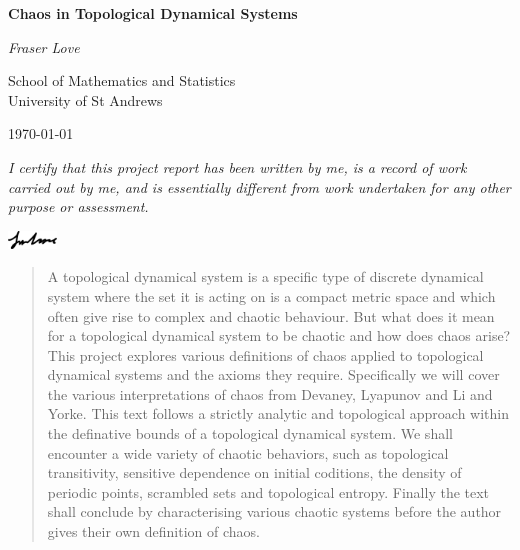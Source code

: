 \documentclass[11pt,a4paper,oneside]{memoir}
\theoremstyle{plain}
\theoremstyle{definition}
\begin{document}
\begin{titlingpage}
    \centering
        \vspace*{3cm}
 
        \Huge
        \textbf{Chaos in Topological Dynamical Systems}
             
        \vspace{1.5cm}
        
        \LARGE
        \textit{Fraser Love}
             
        \vspace{1.5cm}
             
        \Large
        School of Mathematics and Statistics\\
        University of St Andrews\\

        \vfill

        {\large \today\par}
 \end{titlingpage}

\noindent\textit{I certify that this project report has been written by me, is a record of work carried out by me, and is essentially different from work undertaken for any other purpose or assessment.}

\vspace{0cm}\hspace{12.8cm}\includegraphics[width=1.3cm]{signature}

\begin{abstract}
    \noindent A topological dynamical system is a specific type of discrete dynamical system where the set it is acting on is a compact metric space and which often give rise to complex and chaotic behaviour. But what does it mean for a topological dynamical system to be chaotic and how does chaos arise? This project explores various definitions of chaos applied to topological dynamical systems and the axioms they require. Specifically we will cover the various interpretations of chaos from Devaney, Lyapunov and Li and Yorke. This text follows a strictly analytic and topological approach within the definative bounds of a topological dynamical system. We shall encounter a wide variety of chaotic behaviors, such as topological transitivity, sensitive dependence on initial coditions, the density of periodic points, scrambled sets and topological entropy. Finally the text shall conclude by characterising various chaotic systems before the author gives their own definition of chaos.
\end{abstract}
\end{document}
